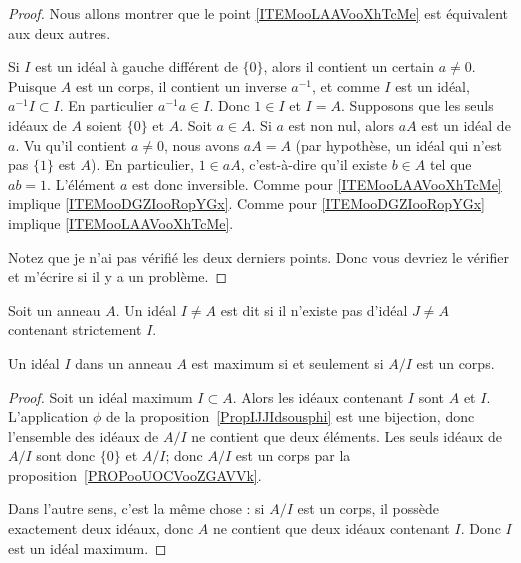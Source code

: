 \begin{proof}
	Nous allons montrer que le point \ref{ITEMooLAAVooXhTcMe} est équivalent aux deux autres.
	\begin{subproof}
		Si \( I\) est un idéal à gauche différent de \( \{ 0 \}\), alors il contient un certain \( a\neq 0\). Puisque \( A\) est un corps, il contient un inverse \( a^{-1}\), et comme \( I\) est un idéal, \( a^{-1} I\subset I\). En particulier \( a^{-1}a\in I\). Donc \( 1\in I\) et \( I=A\).
		Supposons que les seuls idéaux de \( A\) soient \( \{ 0 \}\) et \( A\). Soit \( a\in A\). Si \( a\) est non nul, alors \( aA\) est un idéal de \( a\). Vu qu'il contient \( a\neq 0\), nous avons \( aA=A\) (par hypothèse, un idéal qui n'est pas \( \{ 1 \}\) est \( A\)). En particulier, \( 1\in aA\), c'est-à-dire qu'il existe \( b\in A\) tel que \( ab=1\). L'élément \( a\) est donc inversible.
		Comme pour \ref{ITEMooLAAVooXhTcMe} implique \ref{ITEMooDGZIooRopYGx}.
		Comme pour \ref{ITEMooDGZIooRopYGx} implique \ref{ITEMooLAAVooXhTcMe}.
	\end{subproof}
	Notez que je n'ai pas vérifié les deux derniers points. Donc vous devriez le vérifier et m'écrire si il y a un problème.
\end{proof}

\begin{definition}      \label{DEFIdealMax}
	Soit un anneau \( A\). Un idéal \( I\neq A\) est dit  si il n'existe pas d'idéal \( J\neq A\) contenant strictement \( I\).
\end{definition}

\begin{proposition}     \label{PROPooSHHWooCyZPPw}
	Un idéal \( I\) dans un anneau \( A \) est maximum si et seulement si \( A/I\) est un corps.
\end{proposition}

\begin{proof}
	Soit un idéal maximum \( I\subset A\). Alors les idéaux contenant \( I\) sont \( A\) et \( I\). L'application \( \phi\) de la proposition~\ref{PropIJJIdsousphi} est une bijection, donc l'ensemble des idéaux de \( A/I\) ne contient que deux éléments. Les seuls idéaux de \( A/I\) sont donc \( \{ 0 \}\) et \( A/I\); donc \( A/I\) est un corps par la proposition~\ref{PROPooUOCVooZGAVVk}.

	Dans l'autre sens, c'est la même chose : si \( A/I\) est un corps, il possède exactement deux idéaux, donc \( A\) ne contient que deux idéaux contenant \( I\). Donc \( I\) est un idéal maximum.
\end{proof}

